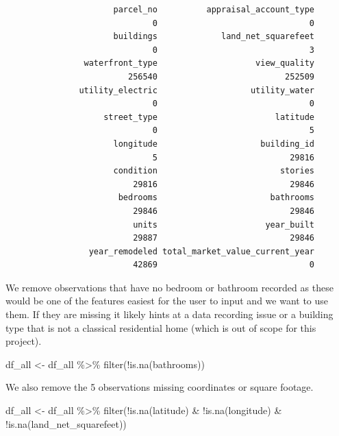 \documentclass[
  english,
  letterpaper,
  DIV=11,
  numbers=noendperiod]{scrreprt}
\newenvironment{Shaded}{\begin{snugshade}}{\end{snugshade}}
\newcommand{\FunctionTok}[1]{\textcolor[rgb]{0.28,0.35,0.67}{#1}}
\newcommand{\NormalTok}[1]{\textcolor[rgb]{0.00,0.23,0.31}{#1}}
\newcommand{\OtherTok}[1]{\textcolor[rgb]{0.00,0.23,0.31}{#1}}
\newcommand{\SpecialCharTok}[1]{\textcolor[rgb]{0.37,0.37,0.37}{#1}}
\begin{document}
\begin{verbatim}
                      parcel_no          appraisal_account_type 
                              0                               0 
                      buildings             land_net_squarefeet 
                              0                               3 
                waterfront_type                    view_quality 
                         256540                          252509 
               utility_electric                   utility_water 
                              0                               0 
                    street_type                        latitude 
                              0                               5 
                      longitude                     building_id 
                              5                           29816 
                      condition                         stories 
                          29816                           29846 
                       bedrooms                       bathrooms 
                          29846                           29846 
                          units                      year_built 
                          29887                           29846 
                 year_remodeled total_market_value_current_year 
                          42869                               0 
\end{verbatim}

We remove observations that have no bedroom or bathroom recorded as
these would be one of the features easiest for the user to input and we
want to use them. If they are missing it likely hints at a data
recording issue or a building type that is not a classical residential
home (which is out of scope for this project).

\begin{Shaded}
\begin{Highlighting}[]
\NormalTok{df\_all }\OtherTok{\textless{}{-}}\NormalTok{ df\_all }\SpecialCharTok{\%\textgreater{}\%} 
  \FunctionTok{filter}\NormalTok{(}\SpecialCharTok{!}\FunctionTok{is.na}\NormalTok{(bathrooms))}
\end{Highlighting}
\end{Shaded}

We also remove the 5 observations missing coordinates or square footage.

\begin{Shaded}
\begin{Highlighting}[]
\NormalTok{df\_all }\OtherTok{\textless{}{-}}\NormalTok{ df\_all }\SpecialCharTok{\%\textgreater{}\%} 
  \FunctionTok{filter}\NormalTok{(}\SpecialCharTok{!}\FunctionTok{is.na}\NormalTok{(latitude) }\SpecialCharTok{\&} \SpecialCharTok{!}\FunctionTok{is.na}\NormalTok{(longitude) }\SpecialCharTok{\&} \SpecialCharTok{!}\FunctionTok{is.na}\NormalTok{(land\_net\_squarefeet))}
\end{Highlighting}
\end{Shaded}
\end{document}
